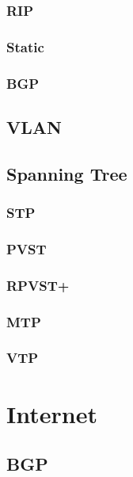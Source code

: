 \documentclass[a4paper,12pt,twoside]{book}
\begin{document}
\subsection{RIP}
\subsection{Static}
\subsection{BGP}

\section{VLAN}


\section{Spanning Tree}

\subsection{STP}
\subsection{PVST}
\subsection{RPVST+}
\subsection{MTP}
\subsection{VTP}



\chapter{Internet}

\section{BGP}

\end{document}
